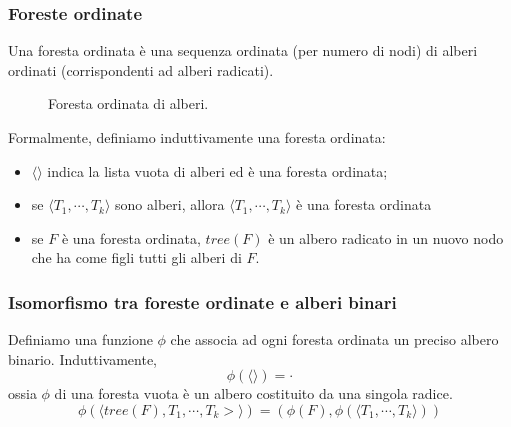 \subsubsection{Foreste ordinate}
Una foresta ordinata è una sequenza ordinata (per numero di nodi) di alberi ordinati (corrispondenti
ad alberi radicati).
\begin{figure}[h]
	\centering
	\caption{Foresta ordinata di alberi.}
	\label{fig:ordered_forest}
\end{figure}
Formalmente, definiamo induttivamente una foresta ordinata:
\begin{itemize}
	\item $\langle \rangle$ indica la lista vuota di alberi ed è una foresta ordinata;
	\item se $\langle T_1, \cdots, T_k\rangle$ sono alberi, allora $\langle T_1, \cdots, T_k\rangle$ è una
	      foresta ordinata
	\item se $F$ è una foresta ordinata, $tree(F)$ è un albero radicato in un
	      nuovo nodo che ha come figli tutti gli alberi di $F$.
\end{itemize}

\subsubsection{Isomorfismo tra foreste ordinate e alberi binari}
Definiamo una funzione $\phi$ che associa ad ogni foresta ordinata un preciso albero binario.
Induttivamente,
$$
	\phi(\langle \rangle) = \cdot
$$
ossia $\phi$ di una foresta vuota è un albero costituito da una singola radice.
$$
	\phi(\langle tree(F), T_1, \cdots, T_k>\rangle) = (\phi(F), \phi(\langle T_1, \cdots, T_k\rangle))
$$


